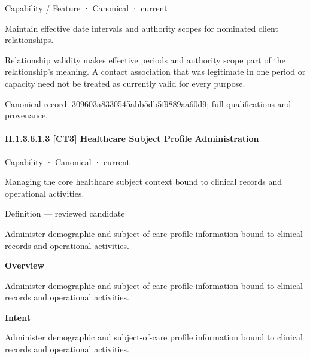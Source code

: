 \label{element:309603a8330545abb5db5f9889aa60d9}
{\small Capability / Feature · Canonical · current}\par

Maintain effective date intervals and authority scopes for nominated client relationships.



Relationship validity makes effective periods and authority scope part of the relationship's meaning. A contact association that was legitimate in one period or capacity need not be treated as currently valid for every purpose.


{\footnotesize \href{../../../../continuum/strategy/capability/feature/309603a8330545abb5db5f9889aa60d9.md}{Canonical record: 309603a8330545abb5db5f9889aa60d9}; full qualifications and provenance.}\par
\paragraph*{II.1.3.6.1.3 [CT3] Healthcare Subject Profile Administration}
\label{navigation:II.1.3.6.1.3}

\label{element:df214b5499694b768eb4a7a175a9d471}
{\small Capability · Canonical · current}\par

Managing the core healthcare subject context bound to clinical records and operational activities.



Definition — reviewed candidate



Administer demographic and subject-of-care profile information bound to clinical records and operational activities.



\textbf{Overview}



Administer demographic and subject-of-care profile information bound to clinical records and operational activities.



\textbf{Intent}



Administer demographic and subject-of-care profile information bound to clinical records and operational activities.



